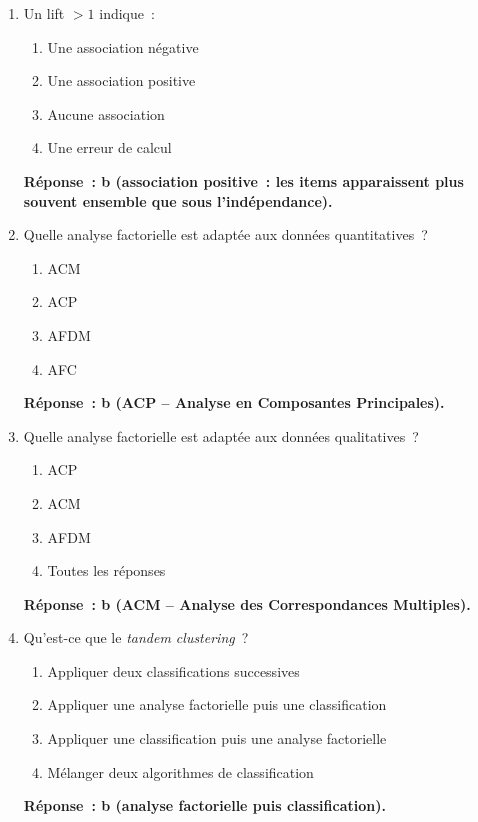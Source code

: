 \documentclass[a4paper,11pt]{article}
\theoremstyle{definition}
\theoremstyle{remark}
\begin{document}
\begin{enumerate}
  \item Un lift $> 1$ indique~:
    \begin{enumerate}
      \item Une association n\'egative
      \item Une association positive
      \item Aucune association
      \item Une erreur de calcul
    \end{enumerate}
    \textbf{R\'eponse~: b (association positive~: les items
    apparaissent plus souvent ensemble que sous l'ind\'ependance).}

  \item Quelle analyse factorielle est adapt\'ee aux donn\'ees
    quantitatives~?
    \begin{enumerate}
      \item ACM
      \item ACP
      \item AFDM
      \item AFC
    \end{enumerate}
    \textbf{R\'eponse~: b (ACP -- Analyse en Composantes
    Principales).}

  \item Quelle analyse factorielle est adapt\'ee aux donn\'ees
    qualitatives~?
    \begin{enumerate}
      \item ACP
      \item ACM
      \item AFDM
      \item Toutes les r\'eponses
    \end{enumerate}
    \textbf{R\'eponse~: b (ACM -- Analyse des Correspondances
    Multiples).}

  \item Qu'est-ce que le \emph{tandem clustering}~?
    \begin{enumerate}
      \item Appliquer deux classifications successives
      \item Appliquer une analyse factorielle puis une
        classification
      \item Appliquer une classification puis une analyse
        factorielle
      \item M\'elanger deux algorithmes de classification
    \end{enumerate}
    \textbf{R\'eponse~: b (analyse factorielle puis
    classification).}


\end{enumerate}
\end{document}
